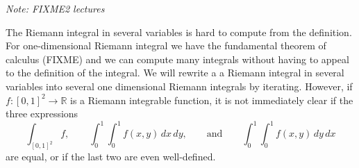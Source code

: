 \documentclass[12pt]{book}
\newcommand{\R}{{\mathbb{R}}}
\newcommand{\sectionnotes}[1]{\noindent \emph{Note: #1} \medskip \par}
\theoremstyle{plain}
\theoremstyle{remark}
\theoremstyle{definition}
\theoremstyle{exercise}
\theoremstyle{example}
\begin{document}
\sectionnotes{FIXME2 lectures}

The Riemann integral in several variables
is hard to compute from the definition.
For one-dimensional Riemann integral we have the fundamental
theorem of calculus (FIXME) and we can compute many integrals without
having to appeal to the definition of the integral.
We will rewrite a 
a Riemann integral in several variables into
several one dimensional Riemann integrals
by iterating.  However, if $f \colon [0,1]^2 \to \R$ is a Riemann integrable
function, it is not immediately clear if the three expressions
\begin{equation*}
\int_{[0,1]^2} f ,
\qquad
\int_0^1 \int_0^1 f(x,y) \, dx \, dy ,
\qquad \text{and}
\qquad
\int_0^1 \int_0^1 f(x,y) \, dy \, dx
\end{equation*}
are equal, or if the last two are even well-defined.
\end{document}
